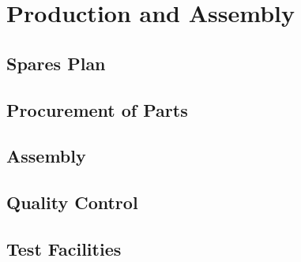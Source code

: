 \section{Production and Assembly}
\label{sec:fdsp-tpcelec-production}

\subsection{Spares Plan}
\label{sec:fdsp-tpcelec-production-spares}

\subsection{Procurement of Parts}
\label{sec:fdsp-tpcelec-production-procurement}

\subsection{Assembly}
\label{sec:fdsp-tpcelec-production-assembly}

\subsection{Quality Control}
\label{sec:fdsp-tpcelec-production-qc}

\subsection{Test Facilities}
\label{sec:fdsp-tpcelec-production-facilities}
